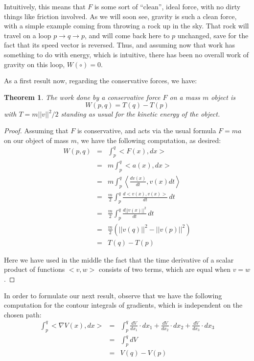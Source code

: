 \documentclass[12pt]{amsbook}
\newtheorem{theorem}{Theorem}[chapter]
\begin{document}
Intuitively, this means that $F$ is some sort of ``clean'', ideal force, with no dirty things like friction involved. As we will soon see, gravity is such a clean force, with a simple example coming from throwing a rock up in the sky. That rock will travel on a loop $p\to q\to p$, and will come back here to $p$ unchanged, save for the fact that its speed vector is reversed. Thus, and assuming now that work has something to do with energy, which is intuitive, there has been no overall work of gravity on this loop, $W(\circ)=0$.

\bigskip

As a first result now, regarding the conservative forces, we have:

\begin{theorem}
The work done by a conservative force $F$ on a mass $m$ object is
$$W(p,q)=T(q)-T(p)$$
with $T=m||v||^2/2$ standing as usual for the kinetic energy of the object.
\end{theorem}

\begin{proof}
Assuming that $F$ is conservative, and acts via the usual formula $F=ma$ on our object of mass $m$, we have the following computation, as desired:
\begin{eqnarray*}
W(p,q)
&=&\int_p^q<F(x),dx>\\
&=&m\int_p^q<a(x),dx>\\
&=&m\int_p^q\left<\frac{dv(x)}{dt},v(x)dt\right>\\
&=&\frac{m}{2}\int_p^q\frac{d<v(x),v(x)>}{dt}\,dt\\
&=&\frac{m}{2}\int_p^q\frac{d||v(x)||^2}{dt}\,dt\\
&=&\frac{m}{2}\left(||v(q)||^2-||v(p)||^2\right)\\
&=&T(q)-T(p)
\end{eqnarray*}

Here we have used in the middle the fact that the time derivative of a scalar product of functions $<v,w>$ consists of two terms, which are equal when $v=w$.
\end{proof}

In order to formulate our next result, observe that we have the following computation for the contour integrals of gradients, which is independent on the chosen path:
\begin{eqnarray*}
\int_p^q<\nabla V(x),dx>
&=&\int_p^q\frac{dV}{dx_1}\cdot dx_1+\frac{dV}{dx_2}\cdot dx_2+\frac{dV}{dx_3}\cdot dx_3\\
&=&\int_p^qdV\\
&=&V(q)-V(p)
\end{eqnarray*}
\end{document}
